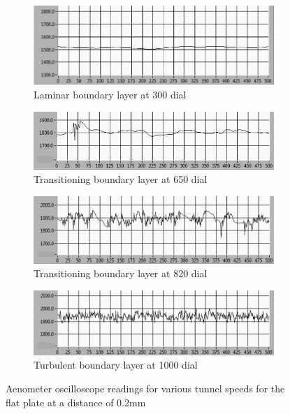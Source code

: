 \documentclass{article}
\begin{document}

\begin{figure}[H]
    \centering 
    \begin{subfigure}{0.8\textwidth}
        \includegraphics[width=\textwidth]{1_laminar.jpg}
        \caption{Laminar boundary layer at 300 dial}
        \label{fig:oscilloscope_laminar}
    \end{subfigure}
    \begin{subfigure}{0.8\textwidth}
        \includegraphics[width=\textwidth]{2_transition.jpg}
        \caption{Transitioning boundary layer at 650 dial}
        \label{fig:oscilloscope_mostly_laminar}
    \end{subfigure}
    \begin{subfigure}{0.8\textwidth}
        \includegraphics[width=\textwidth]{3_transition.jpg}
        \caption{Transitioning boundary layer at 820 dial}
        \label{fig:oscilloscope_mostly_turbulent}
    \end{subfigure}
    \begin{subfigure}{0.8\textwidth}
        \includegraphics[width=\textwidth]{4_turbulent.jpg}
        \caption{Turbulent boundary layer at 1000 dial}
        \label{fig:oscilloscope_turbulent}
    \end{subfigure}
    \caption{Aenometer oscilloscope readings for various tunnel speeds for the flat plate at a distance of 0.2mm}
    \label{fig:oscilloscope}
\end{figure}
\end{document}
